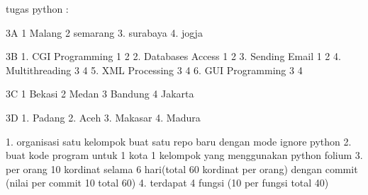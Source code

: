 tugas python :

3A
1 Malang
2 semarang
3. surabaya
4. jogja

3B 
1. CGI Programming 1 2
2. Databases Access 1 2 
3. Sending Email 1 2
4. Multithreading 3 4
5. XML Processing 3 4
6. GUI Programming 3 4

3C
1 Bekasi
2 Medan
3 Bandung
4 Jakarta



3D
1. Padang
2. Aceh
3. Makasar
4. Madura




1. organisasi satu kelompok buat satu repo baru dengan mode ignore python
2. buat kode program untuk 1 kota 1 kelompok yang menggunakan python folium
3. per orang 10 kordinat selama 6 hari(total 60 kordinat per orang) dengan commit (nilai per commit 10 total 60)
4. terdapat 4 fungsi (10 per fungsi total 40)

